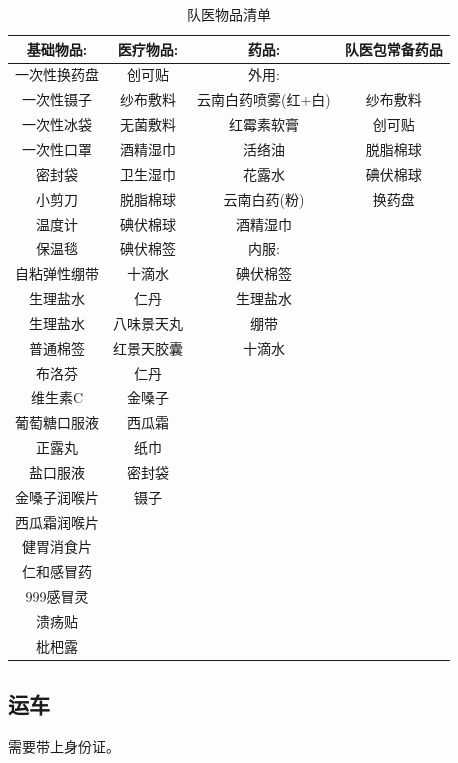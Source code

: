 \documentclass{ctexbook}
\begin{document}
\begin{table}[H]
    \centering
    \begin{tabular}{|c|c|c|c|}
    \hline
        基础物品: & 医疗物品: & 药品: & 队医包常备药品 \\ \hline
        一次性换药盘 & 创可贴 & 外用: & ~ \\ \hline
        一次性镊子 & 纱布敷料 & 云南白药喷雾(红+白) & 纱布敷料 \\ \hline
        一次性冰袋 & 无菌敷料 & 红霉素软膏 & 创可贴 \\ \hline
        一次性口罩 & 酒精湿巾 & 活络油 & 脱脂棉球 \\ \hline
        密封袋 & 卫生湿巾 & 花露水 & 碘伏棉球 \\ \hline
        小剪刀 & 脱脂棉球 & 云南白药(粉) & 换药盘 \\ \hline
        温度计 & 碘伏棉球 & 酒精湿巾 & ~ \\ \hline
        保温毯 & 碘伏棉签 & 内服: & ~ \\ \hline
        自粘弹性绷带 & 十滴水 & 碘伏棉签 & ~ \\ \hline
        生理盐水 & 仁丹 & 生理盐水 & ~ \\ \hline
        生理盐水 & 八味景天丸 & 绷带 & ~ \\ \hline
        普通棉签 & 红景天胶囊 & 十滴水 & ~ \\ \hline
        布洛芬 & 仁丹 & ~ & ~ \\ \hline
        维生素C & 金嗓子 & ~ & ~ \\ \hline
        葡萄糖口服液 & 西瓜霜 & ~ & ~ \\ \hline
        正露丸 & 纸巾 & ~ & ~ \\ \hline
        盐口服液 & 密封袋 & ~ & ~ \\ \hline
        金嗓子润喉片 & 镊子 & ~ & ~ \\ \hline
        西瓜霜润喉片 & ~ & ~ & ~ \\ \hline
        健胃消食片 & ~ & ~ & ~ \\ \hline
        仁和感冒药 & ~ & ~ & ~ \\ \hline
        999感冒灵 & ~ & ~ & ~ \\ \hline
        溃疡贴 & ~ & ~ & ~ \\ \hline
        枇杷露 & ~ & ~ & ~ \\ \hline
    \end{tabular}
    \caption{队医物品清单}
\end{table}


\subsection{运车}
需要带上身份证。
\end{document}
